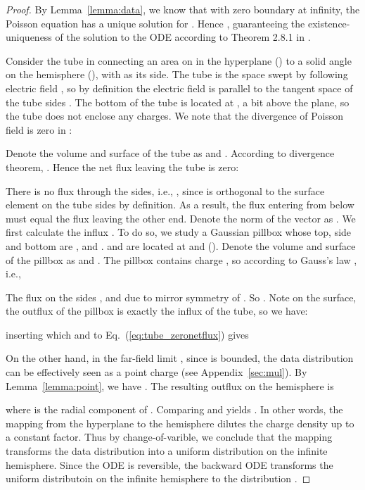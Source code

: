 \begin{proof}

{By Lemma~\ref{lemma:data}, we know that with zero boundary at infinity, the Poisson equation  has a unique solution  for . Hence , guaranteeing the existence-uniqueness of the solution to the ODE  according to Theorem 2.8.1 in \cite{Ricardo2002AMI}.}

Consider the tube in  connecting an area on  in the  hyperplane () to a solid angle  on the hemisphere (), with  as its side. The tube is the space swept by  following electric field , so by definition the electric field is parallel to the tangent space of the tube sides . The bottom of the tube  is located at , a bit above the  plane, so the tube does not enclose any charges.  We note that the divergence of Poisson field is zero in :

Denote the volume and surface of the tube as  and . According to divergence theorem, . Hence the net flux leaving the tube is zero:



There is no flux through the sides, i.e., , since  is orthogonal to the surface element  on the tube sides by definition. As a result, the flux  entering from below must equal the flux  leaving the other end. Denote the  norm of the vector  as . We first calculate the influx . To do so, we study a Gaussian pillbox whose top, side and bottom are ,  and .  and  are located at  and  (). Denote the volume and surface of the pillbox as  and . The pillbox contains charge , so according to Gauss's law , i.e.,

The flux on the sides , and  due to mirror symmetry of . So .  Note on the  surface, the outflux of the pillbox is exactly the influx of the tube, so we have:

inserting which and  to Eq.~(\ref{eq:tube_zeronetflux}) gives 

On the other hand, in the far-field limit , since  is bounded, the data distribution can be effectively seen as a point charge (see Appendix~\ref{sec:mul}). By Lemma~\ref{lemma:point}, we have . The resulting outflux on the hemisphere is

where  is the radial component of . Comparing  and  yields 
.
In other words, the mapping from the  hyperplane to the hemisphere dilutes the charge density  up to a constant factor. Thus by change-of-varible, we conclude that the mapping transforms the data distribution into a uniform distribution on the infinite hemisphere. Since the ODE is reversible, the backward ODE transforms the uniform distributoin on the infinite hemisphere to the distribution .
\end{proof}



